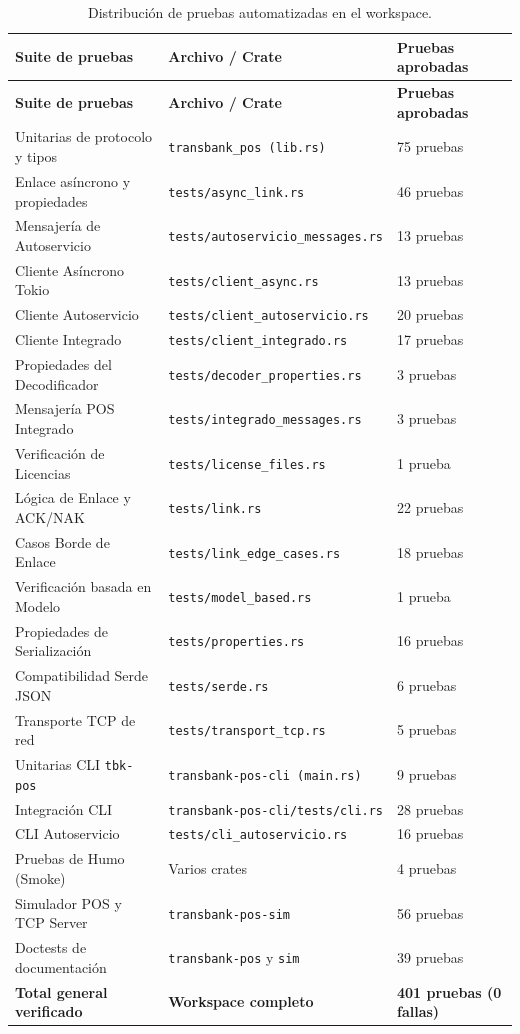 \documentclass{../../plantilla/raysac-informe}
\begin{document}
\begin{longtable}{@{}p{5.5cm}p{5.5cm}p{3.0cm}@{}}
\caption{Distribución de pruebas automatizadas en el workspace.}\label{tab:desglose-tests}\\
\toprule
\textbf{Suite de pruebas} & \textbf{Archivo / Crate} & \textbf{Pruebas aprobadas} \\
\midrule
\endfirsthead
\toprule
\textbf{Suite de pruebas} & \textbf{Archivo / Crate} & \textbf{Pruebas aprobadas} \\
\midrule
\endhead
\bottomrule
\endlastfoot
Unitarias de protocolo y tipos & \texttt{transbank\_pos (lib.rs)} & 75 pruebas \\
Enlace asíncrono y propiedades & \texttt{tests/async\_link.rs} & 46 pruebas \\
Mensajería de Autoservicio & \texttt{tests/autoservicio\_messages.rs} & 13 pruebas \\
Cliente Asíncrono Tokio & \texttt{tests/client\_async.rs} & 13 pruebas \\
Cliente Autoservicio & \texttt{tests/client\_autoservicio.rs} & 20 pruebas \\
Cliente Integrado & \texttt{tests/client\_integrado.rs} & 17 pruebas \\
Propiedades del Decodificador & \texttt{tests/decoder\_properties.rs} & 3 pruebas \\
Mensajería POS Integrado & \texttt{tests/integrado\_messages.rs} & 3 pruebas \\
Verificación de Licencias & \texttt{tests/license\_files.rs} & 1 prueba \\
Lógica de Enlace y ACK/NAK & \texttt{tests/link.rs} & 22 pruebas \\
Casos Borde de Enlace & \texttt{tests/link\_edge\_cases.rs} & 18 pruebas \\
Verificación basada en Modelo & \texttt{tests/model\_based.rs} & 1 prueba \\
Propiedades de Serialización & \texttt{tests/properties.rs} & 16 pruebas \\
Compatibilidad Serde JSON & \texttt{tests/serde.rs} & 6 pruebas \\
Transporte TCP de red & \texttt{tests/transport\_tcp.rs} & 5 pruebas \\
Unitarias CLI \texttt{tbk-pos} & \texttt{transbank-pos-cli (main.rs)} & 9 pruebas \\
Integración CLI & \texttt{transbank-pos-cli/tests/cli.rs} & 28 pruebas \\
CLI Autoservicio & \texttt{tests/cli\_autoservicio.rs} & 16 pruebas \\
Pruebas de Humo (Smoke) & Varios crates & 4 pruebas \\
Simulador POS y TCP Server & \texttt{transbank-pos-sim} & 56 pruebas \\
Doctests de documentación & \texttt{transbank-pos} y \texttt{sim} & 39 pruebas \\
\midrule
\textbf{Total general verificado} & \textbf{Workspace completo} & \textbf{401 pruebas (0 fallas)} \\
\bottomrule
\end{longtable}
\end{document}
